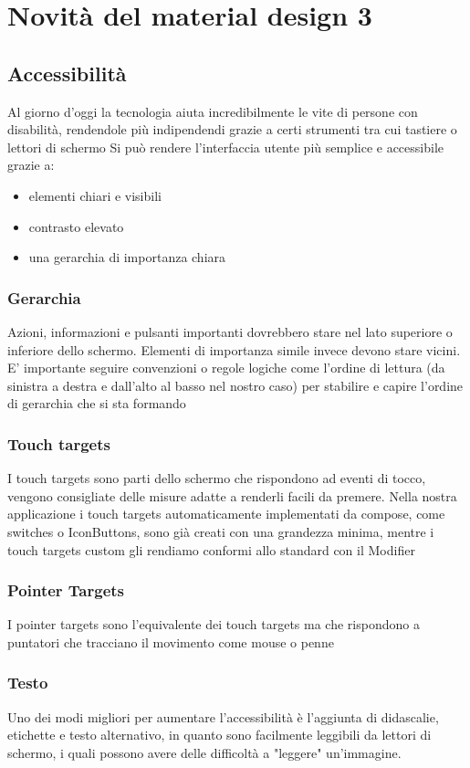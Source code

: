 \documentclass[12pt, a4paper]{report}
\begin{document}
\chapter{Novità del material design 3}
	\section{Accessibilità}
		Al giorno d'oggi la tecnologia aiuta incredibilmente le vite di persone con disabilità, rendendole più indipendendi grazie a certi strumenti tra cui tastiere o lettori di schermo
		Si può rendere l'interfaccia utente più semplice e accessibile grazie a:
		\begin{itemize}
			\item elementi chiari e visibili
			\item contrasto elevato
			\item una gerarchia di importanza chiara
		\end{itemize}
		\subsection{Gerarchia}
			Azioni, informazioni e pulsanti importanti dovrebbero stare nel lato superiore o inferiore dello schermo.
			Elementi di importanza simile invece devono stare vicini. E' importante seguire convenzioni o regole logiche come l'ordine di lettura (da sinistra a destra e dall'alto al basso nel nostro caso) per stabilire e capire l'ordine di gerarchia che si sta formando
		\subsection{Touch targets}
			I touch targets sono parti dello schermo che rispondono ad eventi di tocco, vengono consigliate delle misure adatte a renderli facili da premere. Nella nostra applicazione i touch targets automaticamente implementati da compose, come switches o IconButtons, sono già creati con una grandezza minima,
			mentre i touch targets custom gli rendiamo conformi allo standard con il Modifier
		\subsection{Pointer Targets}
			I pointer targets sono l'equivalente dei touch targets ma che rispondono a puntatori che tracciano il movimento come mouse o penne
		\subsection{Testo}
			Uno dei modi migliori per aumentare l'accessibilità è l'aggiunta di didascalie, etichette e testo alternativo, in quanto sono facilmente leggibili da lettori di schermo, i quali possono avere delle difficoltà a "leggere" un'immagine.
			
\end{document}
